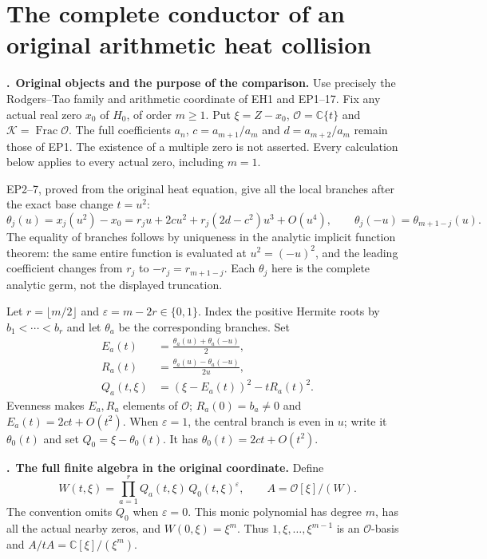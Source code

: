 \section{The complete conductor of an original arithmetic heat collision}
\label{sec:hc}
\newcommand{\HC}{\par\medskip\noindent\textbf{\thehc.}\ }

\HC\textbf{Original objects and the purpose of the comparison.}
Use precisely the Rodgers--Tao family and arithmetic coordinate of
EH1 and EP1--17. Fix any actual real zero $x_0$ of $H_0$, of order
$m\ge1$. Put $\xi=Z-x_0$, $\mathcal O=\mathbb C\{t\}$ and
$\mathcal K=\operatorname{Frac}\mathcal O$. The full coefficients
$a_n$, $c=a_{m+1}/a_m$ and $d=a_{m+2}/a_m$ remain those of EP1.
The existence of a multiple zero is not asserted. Every calculation
below applies to every actual zero, including $m=1$.

EP2--7, proved from the original heat equation, give all the local
branches after the exact base change $t=u^2$:
\[
 \theta_j(u)=x_j(u^2)-x_0
   =r_j u+2cu^2+r_j(2d-c^2)u^3+O(u^4),\qquad
 \theta_j(-u)=\theta_{m+1-j}(u).
 \tag{HC1}
\]
The equality of branches follows by uniqueness in the analytic
implicit function theorem: the same entire function is evaluated
at $u^2=(-u)^2$, and the leading coefficient changes from $r_j$
to $-r_j=r_{m+1-j}$. Each $\theta_j$ here is the complete analytic
germ, not the displayed truncation.

Let $r=\lfloor m/2\rfloor$ and $\varepsilon=m-2r\in\{0,1\}$.
Index the positive Hermite roots by $b_1<\cdots<b_r$ and let
$\theta_a$ be the corresponding branches. Set
\[
 \begin{split}
 E_a(t)&=\frac{\theta_a(u)+\theta_a(-u)}2,\\
 R_a(t)&=\frac{\theta_a(u)-\theta_a(-u)}{2u},\\
 Q_a(t,\xi)&=(\xi-E_a(t))^2-tR_a(t)^2.
 \end{split}
 \tag{HC2}
\]
Evenness makes $E_a,R_a$ elements of $\mathcal O$;
$R_a(0)=b_a\ne0$ and $E_a(t)=2ct+O(t^2)$.
When $\varepsilon=1$, the central branch is even in $u$;
write it $\theta_0(t)$ and set $Q_0=\xi-\theta_0(t)$.
It has $\theta_0(t)=2ct+O(t^2)$.

\HC\textbf{The full finite algebra in the original coordinate.}
Define
\[
 W(t,\xi)=\prod_{a=1}^r Q_a(t,\xi)\,Q_0(t,\xi)^{\varepsilon},
 \qquad A=\mathcal O[\xi]/(W).
 \tag{HC3}
\]
The convention omits $Q_0$ when $\varepsilon=0$. This monic
polynomial has degree $m$, has all the actual nearby zeros, and
$W(0,\xi)=\xi^m$. Thus $1,\xi,\ldots,\xi^{m-1}$ is an
$\mathcal O$-basis and $A/tA=\mathbb C[\xi]/(\xi^m)$.

